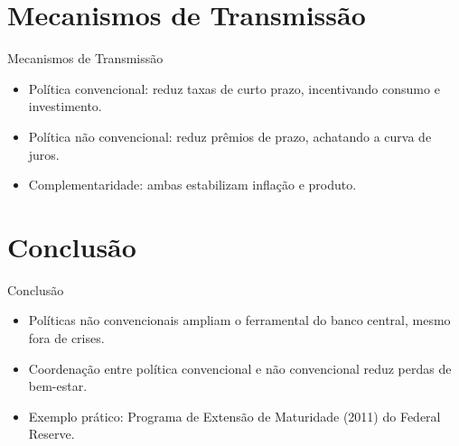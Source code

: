 \documentclass{beamer}
\begin{document}
\section{Mecanismos de Transmissão}

\begin{frame}{Mecanismos de Transmissão}
\begin{itemize}
    \item Política convencional: reduz taxas de curto prazo, incentivando consumo e investimento.
    \item Política não convencional: reduz prêmios de prazo, achatando a curva de juros.
    \item Complementaridade: ambas estabilizam inflação e produto.
\end{itemize}
\end{frame}

\section{Conclusão}

\begin{frame}{Conclusão}
\begin{itemize}
    \item Políticas não convencionais ampliam o ferramental do banco central, mesmo fora de crises.
    \item Coordenação entre política convencional e não convencional reduz perdas de bem-estar.
    \item Exemplo prático: Programa de Extensão de Maturidade (2011) do Federal Reserve.
\end{itemize}
\end{frame}
\end{document}
